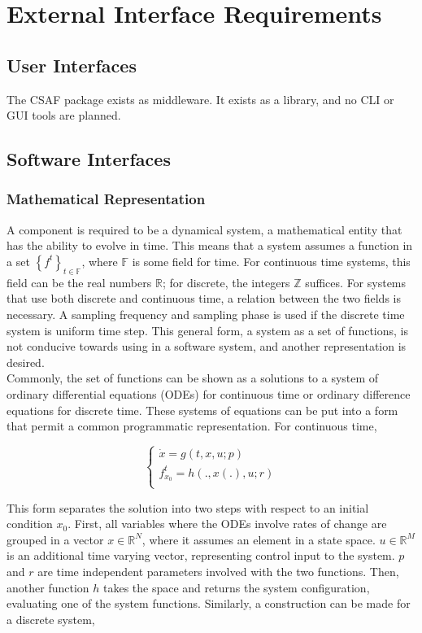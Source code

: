 \chapter{External Interface Requirements}

\section{User Interfaces}

The CSAF package exists as middleware. It exists as a library, and no CLI or GUI tools are planned.

\section{Software Interfaces}

\subsection{Mathematical Representation}
A component is required to be a dynamical system, a mathematical entity that has the ability to evolve in time. This means that a system assumes a function in a set $\left\{ f^t \right\}_{t \in \mathbb F}$, where $\mathbb F$ is some field for time. For continuous time systems, this field can be the real numbers $\mathbb R$; for discrete, the integers $\mathbb Z$ suffices. For systems that use both discrete and continuous time, a relation between the two fields is necessary. A sampling frequency and sampling phase is used if the discrete time system is uniform time step. This general form, a system as a set of functions, is not conducive towards using in a software system, and another representation is desired. \\

Commonly, the set of functions can be shown as a solutions to a system of ordinary differential equations (ODEs) for continuous time or ordinary difference equations for discrete time. These systems of equations can be put into a form that permit a common programmatic representation. For continuous time,

\begin{equation}
\begin{cases}
\dot x = g(t, x, u; p) \\
f_{x_0}^t = h(., x(.), u; r) \\
\end{cases}
\end{equation}

This form separates the solution into two steps with respect to an initial condition $x_0$. First, all variables where the ODEs involve rates of change are grouped in a vector $x \in \mathbb R^N$, where it assumes an element in a state space. $u \in \mathbb R^M$ is an additional time varying vector, representing control input to the system. $p$ and $r$ are time independent parameters involved with the two functions. Then, another function $h$ takes the space and returns the system configuration, evaluating one of the system functions. Similarly, a construction can be made for a discrete system,

